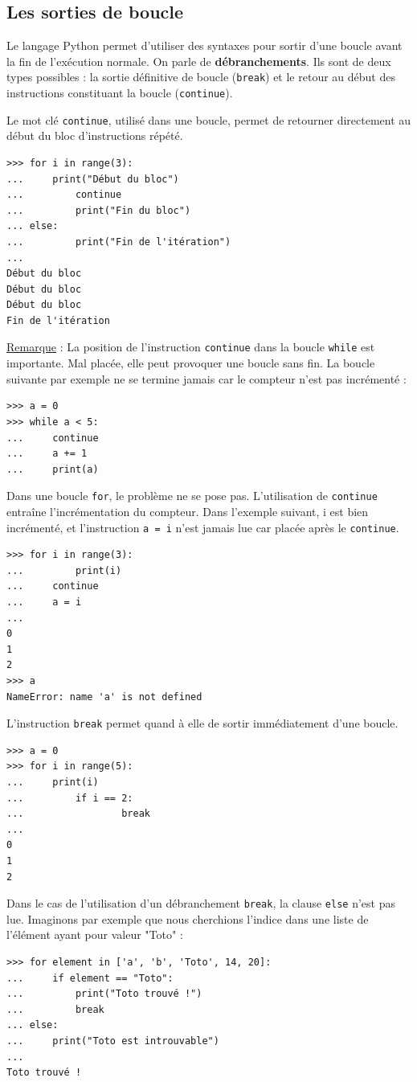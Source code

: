 \documentclass[12pt, a4paper]{article}
\begin{document}
\subsection{Les sorties de boucle}
Le langage Python permet d'utiliser des syntaxes pour sortir d'une boucle avant la fin de l'exécution normale. On parle de \textbf{débranchements}. Ils sont de deux types possibles : la sortie définitive de boucle (\lstinline{break}) et le retour au début des instructions constituant la boucle (\lstinline{continue}).

Le mot clé \lstinline{continue}, utilisé dans une boucle, permet de retourner directement au début du bloc d'instructions répété.
\begin{lstlisting}
>>> for i in range(3):
...     print("Début du bloc")
...			continue
...			print("Fin du bloc")
...	else:
...			print("Fin de l'itération")
...
Début du bloc
Début du bloc
Début du bloc
Fin de l'itération
\end{lstlisting}

\underline{Remarque} : La position de l'instruction \lstinline{continue} dans la boucle \lstinline{while} est importante. Mal placée, elle peut provoquer une boucle sans fin. La boucle suivante par exemple ne se termine jamais car le compteur n'est pas incrémenté :
\begin{lstlisting}
>>> a = 0
>>> while a < 5:
...     continue
...     a += 1
...     print(a)
\end{lstlisting}

Dans une boucle \lstinline{for}, le problème ne se pose pas. L'utilisation de \lstinline{continue} entraîne l'incrémentation du compteur. Dans l'exemple suivant, i est bien incrémenté, et l'instruction \lstinline{a = i} n'est jamais lue car placée après le \lstinline{continue}.
\begin{lstlisting}
>>> for i in range(3):
...			print(i)
...     continue
...     a = i
...
0
1
2
>>> a
NameError: name 'a' is not defined	
\end{lstlisting}

L'instruction \lstinline{break} permet quand à elle de sortir immédiatement d'une boucle. 
\begin{lstlisting}
>>> a = 0
>>> for i in range(5):
...     print(i)
...			if i == 2:
...					break
...
0
1
2
\end{lstlisting}

Dans le cas de l'utilisation d'un débranchement \lstinline{break}, la clause \lstinline{else} n'est pas lue. Imaginons par exemple que nous cherchions l'indice dans une liste de l'élément ayant pour valeur "Toto" :
\begin{lstlisting}
>>> for element in ['a', 'b', 'Toto', 14, 20]:
...     if element == "Toto":
...         print("Toto trouvé !")
...         break
... else:
...     print("Toto est introuvable")
... 
Toto trouvé !
\end{lstlisting}
\end{document}
